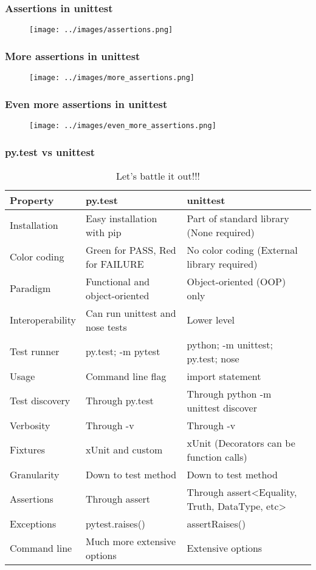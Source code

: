 \documentclass[11pt]{beamer}
\begin{document}
\begin{frame}
\frametitle{Assertions in unittest}
\begin{figure}[h]
	\centering
	\texttt{[image: ../images/assertions.png]}
\end{figure}
\end{frame}

\begin{frame}
\frametitle{More assertions in unittest}
\begin{figure}[h]
	\centering
	\texttt{[image: ../images/more\_assertions.png]}
\end{figure}
\end{frame}

\begin{frame}
\frametitle{Even more assertions in unittest}
\begin{figure}[h]
	\centering
	\texttt{[image: ../images/even\_more\_assertions.png]}
\end{figure}
\end{frame}

\begin{frame}
\frametitle{py.test vs unittest}

\tiny{
\begin{table}
		\begin{tabular}{| l | l | l |}
		\hline
		\textbf{Property} & \textbf{py.test} & \textbf{unittest}\\ 
		\hline \hline
		Installation & Easy installation with pip & Part of standard library (None required) \\
		Color coding &  Green for PASS, Red for FAILURE & No color coding (External library required) \\
		Paradigm & Functional and object-oriented & Object-oriented (OOP) only \\
		Interoperability & Can run unittest and nose tests & Lower level \\
		Test runner & py.test; -m pytest & python; -m unittest; py.test; nose \\
		Usage & Command line flag & import statement \\
		Test discovery & Through py.test & Through python -m unittest discover \\
		Verbosity & Through -v & Through -v \\
		Fixtures & xUnit and custom & xUnit (Decorators can be function calls) \\
		Granularity & Down to test method & Down to test method \\
		Assertions & Through assert & Through assert<Equality, Truth, DataType, etc> \\
		Exceptions & pytest.raises() & assertRaises() \\
		Command line & Much more extensive options & Extensive options \\
		\hline 
	\end{tabular}
\caption{Let's battle it out!!!}
\end{table}
}
\end{frame}
\end{document}
